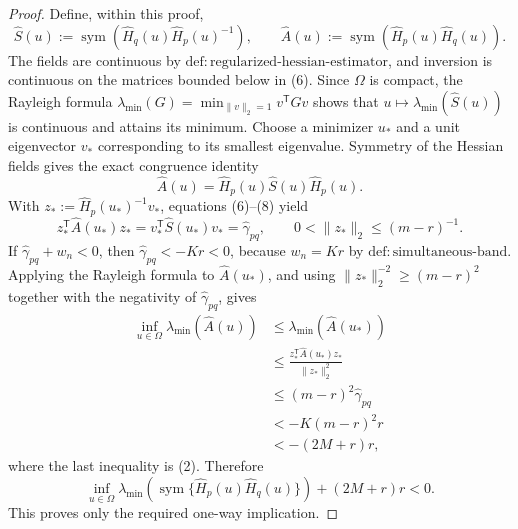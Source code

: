 \documentclass{article}
\begin{document}
\begin{proof}
Define, within this proof,
\[
 \widehat S(u):=\operatorname{sym}\!\left(
   \widehat H_q(u)\widehat H_p(u)^{-1}\right),
 \qquad
 \widehat A(u):=\operatorname{sym}\!\left(
   \widehat H_p(u)\widehat H_q(u)\right).
 \tag{7}
\]
The fields are continuous by \(\mathrm{def:regularized\text{-}hessian\text{-}estimator}\), and inversion is continuous on the matrices bounded below in (6).  Since \(\Omega\) is compact, the Rayleigh formula
\(\lambda_{\min}(G)=\min_{\lVert v\rVert_2=1}v^{\mathsf T}Gv\) shows that \(u\mapsto\lambda_{\min}(\widehat S(u))\) is continuous and attains its minimum.  Choose a minimizer \(u_\ast\) and a unit eigenvector \(v_\ast\) corresponding to its smallest eigenvalue.  Symmetry of the Hessian fields gives the exact congruence identity
\[
 \widehat A(u)=\widehat H_p(u)\widehat S(u)\widehat H_p(u).
 \tag{8}
\]
With \(z_\ast:=\widehat H_p(u_\ast)^{-1}v_\ast\), equations (6)--(8) yield
\[
 z_\ast^{\mathsf T}\widehat A(u_\ast)z_\ast
 =v_\ast^{\mathsf T}\widehat S(u_\ast)v_\ast
 =\widehat\gamma_{pq},
 \qquad
 0<\lVert z_\ast\rVert_2\le(m-r)^{-1}.
 \tag{9}
\]
If \(\widehat\gamma_{pq}+w_n<0\), then \(\widehat\gamma_{pq}<-Kr<0\), because \(w_n=Kr\) by \(\mathrm{def:simultaneous\text{-}band}\).  Applying the Rayleigh formula to \(\widehat A(u_\ast)\), and using \(\lVert z_\ast\rVert_2^{-2}\ge(m-r)^2\) together with the negativity of \(\widehat\gamma_{pq}\), gives
\[
 \begin{aligned}
 \inf_{u\in\Omega}\lambda_{\min}(\widehat A(u))
 &\le \lambda_{\min}(\widehat A(u_\ast))\\
 &\le
 \frac{z_\ast^{\mathsf T}\widehat A(u_\ast)z_\ast}
      {\lVert z_\ast\rVert_2^2}\\
 &\le(m-r)^2\widehat\gamma_{pq}\\
 &<-K(m-r)^2r\\
 &<-(2M+r)r,
 \end{aligned}
 \tag{10}
\]
where the last inequality is (2).  Therefore
\[
 \inf_{u\in\Omega}\lambda_{\min}\!\left(
 \operatorname{sym}\{\widehat H_p(u)\widehat H_q(u)\}\right)
 +(2M+r)r<0.
 \tag{11}
\]
This proves only the required one-way implication.


\end{proof}
\end{document}
